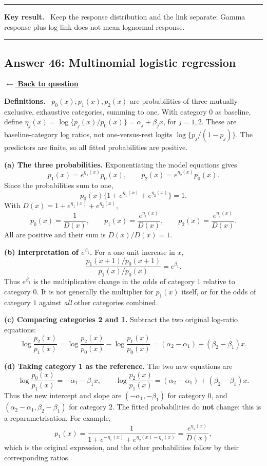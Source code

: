 \documentclass[11pt,a4paper]{article}
\newcommand{\answernav}[1]{%
  \label{answer:#1}%
  \noindent\hyperref[question:#1]{$\leftarrow$ \textbf{Back to question}}%
  \par\smallskip}
\newcommand{\studyheading}[1]{%
  \par\medskip\noindent\textcolor{statblue}{\textbf{#1.}}\ }
\newenvironment{keyresult}
  {\begin{center}\begin{minipage}{0.92\linewidth}\color{statblue}%
   \hrule\vspace{6pt}\textbf{Key result.}\ }
  {\vspace{6pt}\hrule\end{minipage}\end{center}}
\begin{document}
\begin{keyresult}
Keep the response distribution and the link separate:
Gamma response plus log link does not mean lognormal response.
\end{keyresult}

\clearpage

\subsection{Answer 46: Multinomial logistic regression}
\answernav{46}

\studyheading{Definitions}
$p_0(x),p_1(x),p_2(x)$ are probabilities of three mutually exclusive, exhaustive categories, summing to one.
With category 0 as baseline, define
$\eta_j(x)=\log\{p_j(x)/p_0(x)\}=\alpha_j+\beta_jx$, for $j=1,2$.
These are baseline-category log ratios, not one-versus-rest logits $\log\{p_j/(1-p_j)\}$.
The predictors are finite, so all fitted probabilities are positive.

\textbf{(a) The three probabilities.}
Exponentiating the model equations gives
\[
p_1(x)=e^{\eta_1(x)}p_0(x),\qquad
p_2(x)=e^{\eta_2(x)}p_0(x).
\]
Since the probabilities sum to one,
\[
p_0(x)\{1+e^{\eta_1(x)}+e^{\eta_2(x)}\}=1.
\]
With $D(x)=1+e^{\eta_1(x)}+e^{\eta_2(x)}$,
\[
\boxed{p_0(x)=\frac1{D(x)},\qquad
p_1(x)=\frac{e^{\eta_1(x)}}{D(x)},\qquad
p_2(x)=\frac{e^{\eta_2(x)}}{D(x)}.}
\]
All are positive and their sum is $D(x)/D(x)=1$.

\textbf{(b) Interpretation of $e^{\beta_1}$.}
For a one-unit increase in $x$,
\[
\boxed{
\frac{p_1(x+1)/p_0(x+1)}{p_1(x)/p_0(x)}=e^{\beta_1}.
}
\]
Thus $e^{\beta_1}$ is the multiplicative change in the odds of category
$1$ relative to category $0$. It is not generally the multiplier for
$p_1(x)$ itself, or for the odds of category $1$ against \emph{all} other
categories combined.

\textbf{(c) Comparing categories 2 and 1.}
Subtract the two original log-ratio equations:
\[
\boxed{
\log\frac{p_2(x)}{p_1(x)}
=\log\frac{p_2(x)}{p_0(x)}-\log\frac{p_1(x)}{p_0(x)}
=(\alpha_2-\alpha_1)+(\beta_2-\beta_1)x.
}
\]

\textbf{(d) Taking category 1 as the reference.}
The two new equations are
\[
\log\frac{p_0(x)}{p_1(x)}=-\alpha_1-\beta_1x,
\qquad
\log\frac{p_2(x)}{p_1(x)}
=(\alpha_2-\alpha_1)+(\beta_2-\beta_1)x.
\]
Thus the new intercept and slope are $(-\alpha_1,-\beta_1)$ for category
$0$, and $(\alpha_2-\alpha_1,\beta_2-\beta_1)$ for category $2$.
The fitted probabilities do \textbf{not} change: this is a reparametrisation.
For example,
\[
p_1(x)=\frac1{1+e^{-\eta_1(x)}+e^{\eta_2(x)-\eta_1(x)}}
=\frac{e^{\eta_1(x)}}{D(x)},
\]
which is the original expression, and the other probabilities follow by
their corresponding ratios.
\end{document}
